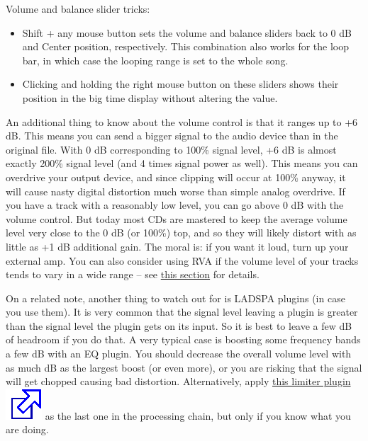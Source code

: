 \documentclass[10pt,english]{article}
\begin{document}
Volume and balance slider tricks:


\begin{itemize}
\item Shift + any mouse button sets the volume and balance
sliders back to 0 dB and Center position, respectively. This
combination also works for the loop bar, in which case the
looping range is set to the whole song.

\item Clicking and holding the right mouse button on these
sliders shows their position in the big time display without
altering the value.
\end{itemize}



\noindent An additional thing to know about the volume control is
that it ranges up to +6 dB. This means you can send a bigger
signal to the audio device than in the original file. With 0
dB corresponding to 100\% signal level, +6 dB is almost exactly
200\% signal level (and 4 times signal power as well). This
means you can overdrive your output device, and since clipping
will occur at 100\% anyway, it will cause nasty digital
distortion much worse than simple analog overdrive. If you
have a track with a reasonably low level, you can go above 0
dB with the volume control. But today most CDs are mastered to
keep the average volume level very close to the 0 dB (or 100\%)
top, and so they will likely distort with as little as +1 dB
additional gain. The moral is: if you want it loud, turn up
your external amp. You can also consider using RVA if the
volume level of your tracks tends to vary in a wide range
-- see \hyperref[idp645824]{\color{blue}this section} for
details.




On a related note, another thing to watch out for is LADSPA
plugins (in case you use them). It is very common that the
signal level leaving a plugin is greater than the signal level
the plugin gets on its input. So it is best to leave a few dB
of headroom if you do that. A very typical case is boosting
some frequency bands a few dB with an EQ plugin. You should
decrease the overall volume level with as much dB as the
largest boost (or even more), or you are risking that the
signal will get chopped causing bad distortion. Alternatively,
apply \href{http://tap-plugins.sourceforge.net/ladspa/limiter.html}{this
limiter plugin\includegraphics[scale=0.5]{external.eps}} as the last one in the processing chain,
but only if you know what you are doing.
\end{document}
